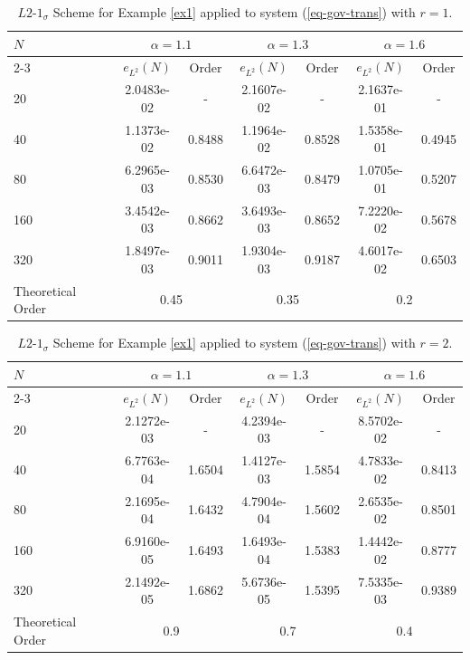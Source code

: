 \documentclass[11pt]{article}
\numberwithin{equation}{section}
\begin{document}
\begin{table}[!ht]
\caption{$L2$-$1_\sigma$ Scheme for Example \ref{ex1} applied to system (\ref{eq-gov-trans}) with $r=1$.}
\renewcommand{\arraystretch}{1}
\def\temptablewidth{0.95\textwidth}
\begin{center}
 \begin{tabular*}{\temptablewidth}{@{\extracolsep{\fill}}lcccccc}\hline
 $N$  &\multicolumn{2}{c}{$\alpha=1.1$} &\multicolumn{2}{c}{$\alpha=1.3$} &\multicolumn{2}{c}{$\alpha=1.6$}\\
 \cline{2-3}\cline{4-5}\cline{6-7}
 & $e_{L^{2}}(N)$         &Order     &$e_{L^{2}}(N)$    &Order    &$e_{L^{2}}(N)$ &Order     \\ \hline   
 20  &2.0483e-02   &-       &2.1607e-02   &-        &2.1637e-01  &-  \\
 40  &1.1373e-02   &0.8488  &1.1964e-02   &0.8528   &1.5358e-01  &0.4945    \\
 80  &6.2965e-03   &0.8530  &6.6472e-03   &0.8479   &1.0705e-01  &0.5207 
 \\
 160 &3.4542e-03   &0.8662  &3.6493e-03   &0.8652   &7.2220e-02  &0.5678    \\
 320 &1.8497e-03   &0.9011  &1.9304e-03   &0.9187   &4.6017e-02  &0.6503  \\\hline
 Theoretical Order
 &\multicolumn{2}{c}{0.45} &\multicolumn{2}{c}{0.35}&\multicolumn{2}{c}{0.2}\\ \hline
\end{tabular*}
\end{center}
\end{table}



\begin{table}[!ht]
\caption{$L2$-$1_\sigma$ Scheme for Example \ref{ex1} applied to system (\ref{eq-gov-trans}) with $r=2$.}
\renewcommand{\arraystretch}{1}
\def\temptablewidth{0.95\textwidth}
\begin{center}
 \begin{tabular*}{\temptablewidth}{@{\extracolsep{\fill}}lcccccc}\hline
 $N$  &\multicolumn{2}{c}{$\alpha=1.1$} &\multicolumn{2}{c}{$\alpha=1.3$} &\multicolumn{2}{c}{$\alpha=1.6$}\\
 \cline{2-3}\cline{4-5}\cline{6-7}
 & $e_{L^{2}}(N)$         &Order     &$e_{L^{2}}(N)$    &Order    &$e_{L^{2}}(N)$ &Order     \\ \hline 
 20  &2.1272e-03   &-       &4.2394e-03   &-        &8.5702e-02  &-  \\
 40  &6.7763e-04   &1.6504  &1.4127e-03   &1.5854   &4.7833e-02  &0.8413    \\
 80  &2.1695e-04   &1.6432  &4.7904e-04   &1.5602   &2.6535e-02  &0.8501  \\
 160 &6.9160e-05   &1.6493  &1.6493e-04   &1.5383   &1.4442e-02  &0.8777    \\
 320 &2.1492e-05   &1.6862  &5.6736e-05   &1.5395   &7.5335e-03  &0.9389  \\\hline
 Theoretical Order
 &\multicolumn{2}{c}{0.9} &\multicolumn{2}{c}{0.7}&\multicolumn{2}{c}{0.4}\\ \hline
\end{tabular*}
\end{center}
\end{table}
\end{document}
